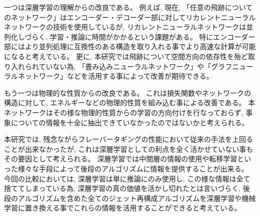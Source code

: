 一つは深層学習の理解からの改良である。
例えば, 現在, 「任意の飛跡についてのネットワーク」はエンコーダー・デコーダー部に対してリカレントニューラルネットワークの技術を使用しているが, リカレントニューラルネットワークは並列化しづらく, 学習・推論に時間がかかるという課題がある。
特にエンコーダー部にはより並列処理に互換性のある構造を取り入れる事でより高速な計算が可能になると考えている。
更に, 本研究では飛跡について空間方向の依存性を殆ど取り入れられていない為, 「畳み込みニューラルネットワーク」や「グラフニューラルネットワーク」などを活用する事によって改善が期待できる。

もう一つは物理的な性質からの改良である。
これは損失関数やネットワークの構造に対して, エネルギーなどの物理的性質を組み込む事による改善である。
本ネットワークはその様な物理的性質からの学習の方向付けを行なっておらず, 事象についての情報を十全に抽出できていなかったのではないかと考えられる。

本研究では, 残念ながらフレーバータギングの性能において従来の手法を上回ることが出来なかったが, これは深層学習としての利点を全く活かせていない事もその要因として考えられる。
深層学習では中間層の情報の使用や転移学習といった様々な手段によって後段のアルゴリズムに情報を提供することが出来る。
今回の比較においては, 深層学習は単に推論にのみ使用し, この様な情報は全て捨ててしまっている為, 深層学習の真の価値を活かし切れたとは言いづらく, 後段のアルゴリズムを含めた全てのジェット再構成アルゴリズムを深層学習や機械学習に置き換える事でこれらの情報を活用することができると考えている。

















